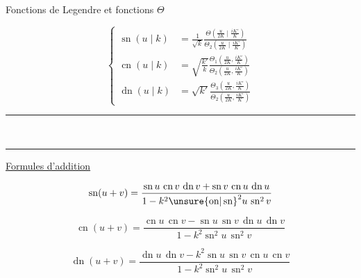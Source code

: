 Fonctions de Legendre et fonctions $\Theta$

\[
\left\{\begin{aligned}
\operatorname{sn}(u\mid k)&=\frac1{\sqrt k}\frac{\Theta(\frac{u}{2K}\mid\frac{iK'}K)}{\Theta_2(\frac{u}{2K}\mid\frac{iK'}K)}\\
\operatorname{cn}(u\mid k)&=\sqrt{\frac{k'}k}\frac{\Theta_1(\frac{u}{2K},\frac{iK'}K)}{\Theta_2(\frac{u}{2K},\frac{iK'}K)}\\
\operatorname{dn}(u\mid k)&=\sqrt{k'}\frac{\Theta_3(\frac{u}{2K},\frac{iK'}K)}{\Theta_2(\frac{u}{2K},\frac{iK'}K)}
\end{aligned}\right.
\]

\begin{center}\rule{.5\linewidth}{.4pt}\\[-.5ex]\rule{.27\linewidth}{.4pt}\end{center}
\uline{Formules d'addition}

\[
\operatorname{sn}(u+v)=\frac{\operatorname{sn} u\,\operatorname{cn} v\,\operatorname{dn} v+\operatorname{sn} v\,\operatorname{cn} u\,\operatorname{dn} u}{1-k^2{\unsure{\mathrm{on}|\operatorname{sn}}}^2u\,\operatorname{sn}^2v}
\]

\[
\operatorname{cn}(u+v)=\frac{\operatorname{cn} u\,\operatorname{cn} v-\operatorname{sn} u\,\operatorname{sn} v\,\operatorname{dn} u\,\operatorname{dn} v}{1-k^2\operatorname{sn}^2u\,\operatorname{sn}^2v}
\]

\[
\operatorname{dn}(u+v)=\frac{\operatorname{dn} u\,\operatorname{dn} v-k^2\operatorname{sn} u\,\operatorname{sn} v\,\operatorname{cn} u\,\operatorname{cn} v}{1-k^2\operatorname{sn}^2u\,\operatorname{sn}^2v}
\]

